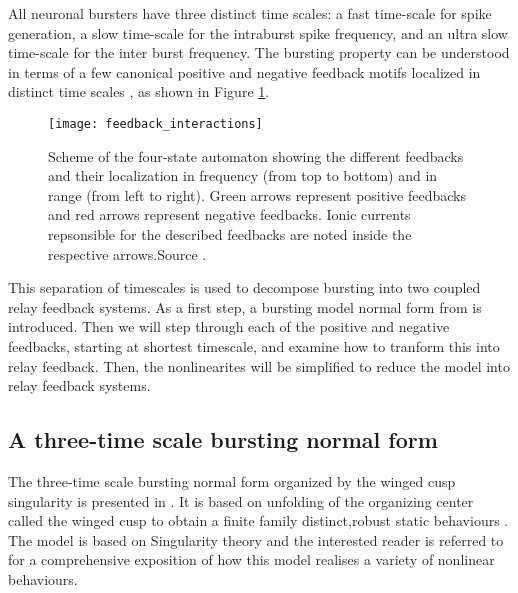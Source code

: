 \documentclass[a4paper, 12pt]{article}
\begin{document}
All neuronal bursters have three distinct time scales: a fast time-scale for spike generation, a slow time-scale for the intraburst spike frequency, and an ultra slow time-scale for the inter burst frequency\cite{franci2}. The bursting property can be understood in terms of a few canonical positive and negative feedback motifs localized in distinct time scales \cite{drion}, as shown in Figure \ref{fig:p_n_feedbacks}.

\begin{figure}[h!]
\texttt{[image: feedback\_interactions]}
\caption{Scheme of the four-state automaton showing the different feedbacks and their localization in frequency (from top to bottom) and in range (from left to right). Green arrows represent positive feedbacks and red arrows represent negative feedbacks. Ionic currents repsonsible for the described feedbacks are noted inside the respective arrows.Source \cite{drion}.}
\label{fig:p_n_feedbacks}
\end{figure}

This separation of timescales is used to decompose bursting into two coupled relay feedback systems. As a first step, a bursting model normal form from \cite{franci} is introduced. Then we will step through each of the positive and negative feedbacks, starting at shortest timescale, and examine how to tranform this into relay feedback. Then, the nonlinearites will be simplified to reduce the model into relay feedback systems. 

\subsection{A three-time scale bursting normal form}
The three-time scale bursting normal form organized by the winged cusp singularity is presented in \cite{franci}. It is based on unfolding of the organizing center called the winged cusp to obtain a finite family distinct,robust static behaviours \cite{franci}. The model is based on Singularity theory and the interested reader is referred to \cite{franci} for a comprehensive exposition of how this model realises a variety of nonlinear behaviours. 
\end{document}
